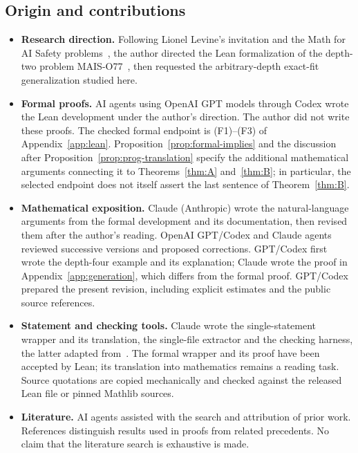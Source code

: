 \documentclass[11pt,a4paper]{article}
\theoremstyle{definition}
\theoremstyle{remark}
\numberwithin{equation}{section}
\begin{document}
\subsection*{Origin and contributions}
\begin{itemize}
\item \textbf{Research direction.} Following Lionel Levine's invitation and the Math for AI Safety problems~\cite{levine-mais,mais-repo}, the author directed the Lean formalization of the depth-two problem MAIS-O77~\cite{mais-o77,feld-o77}, then requested the arbitrary-depth exact-fit generalization studied here.
\item \textbf{Formal proofs.} AI agents using OpenAI GPT models through Codex wrote the Lean development under the author's direction. The author did not write these proofs. The checked formal endpoint is (F1)--(F3) of Appendix~\ref{app:lean}. Proposition~\ref{prop:formal-implies} and the discussion after Proposition~\ref{prop:prog-translation} specify the additional mathematical arguments connecting it to Theorems~\ref{thm:A} and~\ref{thm:B}; in particular, the selected endpoint does not itself assert the last sentence of Theorem~\ref{thm:B}.
\item \textbf{Mathematical exposition.} Claude (Anthropic) wrote the natural-language arguments from the formal development and its documentation, then revised them after the author's reading. OpenAI GPT/Codex and Claude agents reviewed successive versions and proposed corrections. GPT/Codex first wrote the depth-four example and its explanation; Claude wrote the proof in Appendix~\ref{app:generation}, which differs from the formal proof. GPT/Codex prepared the present revision, including explicit estimates and the public source references.
\item \textbf{Statement and checking tools.} Claude wrote the single-statement wrapper and its translation, the single-file extractor and the checking harness, the latter adapted from~\cite{feld-o77}. The formal wrapper and its proof have been accepted by Lean; its translation into mathematics remains a reading task. Source quotations are copied mechanically and checked against the released Lean file or pinned Mathlib sources.
\item \textbf{Literature.} AI agents assisted with the search and attribution of prior work. References distinguish results used in proofs from related precedents. No claim that the literature search is exhaustive is made.
\end{itemize}
\end{document}
